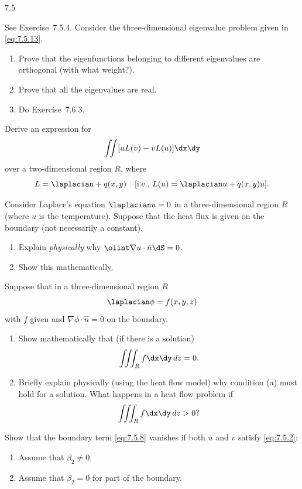 \begin{exercises}{7.5}
\item See Exercise~7.5.4.  Consider the three-dimensional eigenvalue problem given in \eqref{eq:7.5.13}.

\begin{enumerate}
\item[(a)] Prove that the eigenfunctions belonging to different eigenvalues are orthogonal (with what weight?).

\item[(b)] Prove that all the eigenvalues are real.

\item[(c)] Do Exercise~7.6.3.
\end{enumerate}

\item Derive an expression for
\[
\iint [uL(v) - vL(u)]\dx\dy
\]
over a two-dimensional region $R$, where
\[
L = \laplacian + q(x,y) \quad\text{[i.e., } L(u) = \laplacian u + q(x,y)u\text{]}.
\]

\item Consider Laplace's equation $\laplacian u = 0$ in a three-dimensional region $R$ (where $u$ is the temperature).  Suppose that the heat flux is given on the boundary (not necessarily a constant).

\begin{enumerate}
\item[(a)] Explain \emph{physically} why $\oiint\nabla u\cdot\hat{n}\dS = 0$.

\item[(b)] Show this mathematically.
\end{enumerate}

\item Suppose that in a three-dimensional region $R$
\[
\laplacian\phi = f(x,y,z)
\]
with $f$ given and $\nabla\phi\cdot\hat{n} = 0$ on the boundary.

\begin{enumerate}
\item[(a)] Show mathematically that (if there is a solution)
\[
\iiint_R f\dx\dy\,dz = 0.
\]

\item[(b)] Briefly explain physically (using the heat flow model) why condition (a) must hold for a solution.  What happens in a heat flow problem if
\[
\iiint_R f\dx\dy\,dz > 0?
\]
\end{enumerate}

\item Show that the boundary term \eqref{eq:7.5.8} vanishes if both $u$ and $v$ satisfy \eqref{eq:7.5.2}:
\begin{enumerate}
\item[(a)] Assume that $\beta_2 \neq 0$.
\item[(b)] Assume that $\beta_2 = 0$ for part of the boundary.
\end{enumerate}

\end{exercises}

